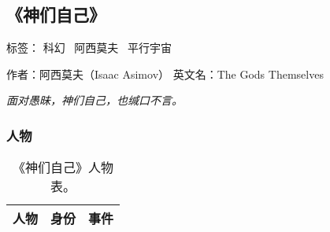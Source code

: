 \subsection{《神们自己》}

标签： 科幻 \  阿西莫夫 \  平行宇宙

作者：阿西莫夫（Isaac Asimov）
英文名：The Gods Themselves

\emph{面对愚昧，神们自己，也缄口不言。}

\subsubsection{人物}

\begin{table}[htpb]
\centering
\caption{《神们自己》人物表。}
\begin{tabular}{p{}|p{}|p{}}
人物 & 身份 & 事件 \\
\hline


\end{tabular}
\end{table}
